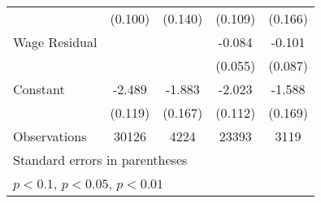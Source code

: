 {\begin{tabular}{l*{4}{c}}
                    &     (0.100)         &     (0.140)         &     (0.109)         &     (0.166)         \\
Wage Residual       &                     &                     &      -0.084         &      -0.101         \\
                    &                     &                     &     (0.055)         &     (0.087)         \\
Constant            &      -2.489\sym{***}&      -1.883\sym{***}&      -2.023\sym{***}&      -1.588\sym{***}\\
                    &     (0.119)         &     (0.167)         &     (0.112)         &     (0.169)         \\
\hline
Observations        &       30126         &        4224         &       23393         &        3119         \\
\hline\hline
\multicolumn{5}{l}{\footnotesize Standard errors in parentheses}\\
\multicolumn{5}{l}{\footnotesize \sym{*} \(p<0.1\), \sym{**} \(p<0.05\), \sym{***} \(p<0.01\)}\\
\end{tabular}
}
